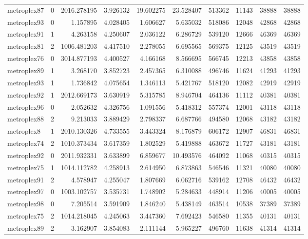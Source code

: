 \documentclass[../../../thesis.tex]{subfiles}
\begin{document}
\begin{longtable}{|l|r|r|r|r|r|r|r|r|r|}
metroplex87 & 0 & 2016.278195 & 3.926132 & 19.602275 & 23.528407 & 513362 & 11143 & 38888 & 38888 \\
metroplex93 & 0 & 1.157895 & 4.028405 & 1.606627 & 5.635032 & 518086 & 12048 & 42868 & 42868 \\
metroplex91 & 1 & 4.263158 & 4.250607 & 2.036122 & 6.286729 & 539120 & 12666 & 46369 & 46369 \\
metroplex81 & 2 & 1006.481203 & 4.417510 & 2.278055 & 6.695565 & 569375 & 12125 & 43519 & 43519 \\
metroplex76 & 0 & 3014.877193 & 4.400527 & 4.166168 & 8.566695 & 566745 & 12213 & 43858 & 43858 \\
metroplex89 & 1 & 3.268170 & 3.852723 & 2.457365 & 6.310088 & 496746 & 11624 & 41293 & 41293 \\
metroplex93 & 1 & 1.736842 & 4.075654 & 1.346113 & 5.421767 & 518120 & 12082 & 42919 & 42919 \\
metroplex92 & 1 & 2012.669173 & 3.630919 & 5.315785 & 8.946704 & 464136 & 11112 & 40381 & 40381 \\
metroplex96 & 0 & 2.052632 & 4.326756 & 1.091556 & 5.418312 & 557374 & 12001 & 43118 & 43118 \\
metroplex88 & 2 & 9.213033 & 3.889429 & 2.798337 & 6.687766 & 494580 & 12068 & 43182 & 43182 \\
metroplex8 & 1 & 2010.130326 & 4.733555 & 3.443324 & 8.176879 & 606172 & 12907 & 46831 & 46831 \\
metroplex74 & 2 & 1010.373434 & 3.617359 & 1.802529 & 5.419888 & 463672 & 11727 & 43181 & 43181 \\
metroplex92 & 0 & 2011.932331 & 3.633899 & 6.859677 & 10.493576 & 464092 & 11068 & 40315 & 40315 \\
metroplex75 & 1 & 1014.112782 & 4.258913 & 2.614950 & 6.873863 & 546546 & 11321 & 40080 & 40080 \\
metroplex91 & 2 & 4.578947 & 4.255047 & 1.807669 & 6.062716 & 539162 & 12708 & 46432 & 46432 \\
metroplex97 & 0 & 1003.102757 & 3.535731 & 1.748902 & 5.284633 & 448914 & 11206 & 40005 & 40005 \\
metroplex98 & 0 & 7.205514 & 3.591909 & 1.846240 & 5.438149 & 463514 & 10538 & 37389 & 37389 \\
metroplex75 & 2 & 1014.218045 & 4.245063 & 3.447360 & 7.692423 & 546580 & 11355 & 40131 & 40131 \\
metroplex89 & 2 & 3.162907 & 3.854083 & 2.111144 & 5.965227 & 496760 & 11638 & 41314 & 41314 \\

\end{longtable}
\end{document}
